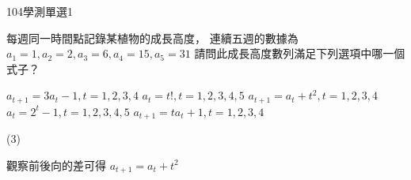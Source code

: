     \begin{QUESTION}
        \begin{ExamInfo}{104}{學測}{單選}{1}
        \end{ExamInfo}
        \begin{ExamAnsRateInfo}{88}{99}{98}{67}
        \end{ExamAnsRateInfo}
        \begin{QBODY}
            每週同一時間點記錄某植物的成長高度， 連續五週的數據為
			${{a}_{1}}=1, {{a}_{2}}=2, {{a}_{3}}=6,{{a}_{4}}=15, {{a}_{5}}=31$
			請問此成長高度數列滿足下列選項中哪一個式子？
			\begin{QOPS}
				\QOP ${{a}_{t+1}}=3{{a}_{t}}-1,t=1,2,3,4$
				\QOP ${{a}_{t}}=t!,t=1,2,3,4,5$
				\QOP ${{a}_{t+1}}={{a}_{t}}+{{t}^{2}},t=1,2,3,4$
				\QOP ${{a}_{t}}={{2}^{t}}-1,t=1,2,3,4,5$
				\QOP ${{a}_{t+1}}=t{{a}_{t}}+1,t=1,2,3,4$
			\end{QOPS}
        \end{QBODY}
        \begin{QFROMS}
        \end{QFROMS}
        \begin{QTAGS}\end{QTAGS}
        \begin{QANS}
            (3)
        \end{QANS}
        \begin{QSOLLIST}
            \begin{QSOL}
				觀察前後向的差可得 ${{a}_{t+1}}={{a}_{t}}+{{t}^{2}}$
			\end{QSOL}

        \end{QSOLLIST}
        \begin{QEMPTYSPACE}
        \end{QEMPTYSPACE}
    \end{QUESTION}
